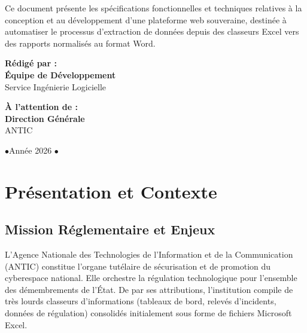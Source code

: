 \documentclass[12pt,a4paper,oneside]{report}
\begin{document}
\begin{titlepage}
\vfill

\begin{minipage}{0.88\textwidth}
\centering\small\color{darktext}
Ce document présente les spécifications fonctionnelles et techniques
relatives à la conception et au développement d'une plateforme web
souveraine, destinée à automatiser le processus d'extraction de données 
depuis des classeurs Excel vers des rapports normalisés au format Word.
\end{minipage}

\vfill

\begin{minipage}[t]{0.48\textwidth}
    \sffamily
    \textbf{\color{primarycolor}Rédigé par :}\\[0.15cm]
    \textbf{Équipe de Développement}\\
    {\small Service Ingénierie Logicielle}
\end{minipage}
\hfill
\begin{minipage}[t]{0.48\textwidth}
    \sffamily
    \textbf{\color{primarycolor}À l'attention de :}\\[0.15cm]
    \textbf{Direction Générale}\\
    {\small ANTIC}
\end{minipage}

\vspace{0.5cm}

{\small\sffamily\color{gray}
 \quad$\bullet$\quad Année 2026 \quad$\bullet$\quad 
}
\end{titlepage}

\newpage

{
  \hypersetup{linkcolor=darktext}
  \tableofcontents
}
\newpage


\chapter{Présentation et Contexte}

\section{Mission Réglementaire et Enjeux}
L'Agence Nationale des Technologies de l'Information et de la Communication (ANTIC) constitue l'organe tutélaire de sécurisation et de promotion du cyberespace national. Elle orchestre la régulation technologique pour l'ensemble des démembrements de l'État. De par ses attributions, l'institution compile de très lourds classeurs d'informations (tableaux de bord, relevés d'incidents, données de régulation) consolidés initialement sous forme de fichiers Microsoft Excel. 
\end{document}
